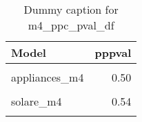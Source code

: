 \begin{table}
\centering
\caption{Dummy caption for m4_ppc_pval_df}
\centering
\fontsize{10}{12}\selectfont
\begin{tabular}[t]{lr}
\toprule
Model & pppval\\
\midrule
\cellcolor{gray!10}{windows\_m4} & \cellcolor{gray!10}{0.44}\\
appliances\_m4 & 0.50\\
\cellcolor{gray!10}{insulation\_m4} & \cellcolor{gray!10}{0.52}\\
solare\_m4 & 0.54\\
\cellcolor{gray!10}{heatpumps\_m4} & \cellcolor{gray!10}{0.46}\\
\bottomrule
\end{tabular}
\end{table}
